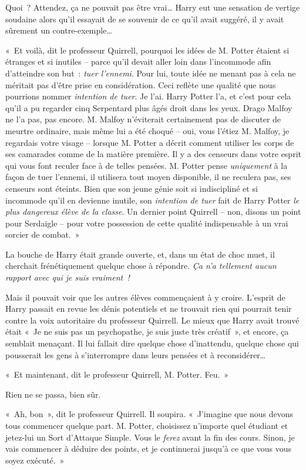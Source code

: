 Quoi~? Attendez, ça ne pouvait pas être vrai… Harry eut une sensation de vertige soudaine alors qu'il essayait de se souvenir de ce qu'il avait suggéré, il y avait sûrement un contre-exemple…

«~Et voilà, dit le professeur Quirrell, pourquoi les idées de M. Potter étaient si étranges et si inutiles -- parce qu'il devait aller loin dans l'incommode afin d'atteindre son but~: \emph{tuer l'ennemi}. Pour lui, toute idée ne menant pas à cela ne méritait pas d'être prise en considération. Ceci reflète une qualité que nous pourrions nommer \emph{intention de tuer}. Je l'ai. Harry Potter l'a, et c'est pour cela qu'il a pu regarder cinq Serpentard plus âgés droit dans les yeux. Drago Malfoy ne l'a pas, pas encore. M. Malfoy n'éviterait certainement pas de discuter de meurtre ordinaire, mais même lui a été choqué -- oui, vous l'étiez M. Malfoy, je regardais votre visage -- lorsque M. Potter a décrit comment utiliser les corps de ses camarades comme de la matière première. Il y a des censeurs dans votre esprit qui vous font reculer face à de telles pensées. M. Potter pense \emph{uniquement} à la façon de tuer l'ennemi, il utilisera tout moyen disponible, il ne reculera pas, ses censeurs sont éteints. Bien que son jeune génie soit si indiscipliné et si incommode qu'il en devienne inutile, son \emph{intention de tuer} fait de Harry Potter \emph{le plus dangereux élève de la classe}. Un dernier point Quirrell -- non, disons un point pour Serdaigle -- pour votre possession de cette qualité indispensable à un vrai sorcier de combat.~»

La bouche de Harry était grande ouverte, et, dans un état de choc muet, il cherchait frénétiquement quelque chose à répondre. \emph{Ça n'a tellement aucun rapport avec qui je suis vraiment~!}

Mais il pouvait voir que les autres élèves commençaient à y croire. L'esprit de Harry passait en revue les dénis potentiels et ne trouvait rien qui pourrait tenir contre la voix autoritaire du professeur Quirrell. Le mieux que Harry avait trouvé était «~Je ne suis pas un psychopathe, je suis juste très créatif~», et encore, ça semblait menaçant. Il lui fallait dire quelque chose d'inattendu, quelque chose qui pousserait les gens à s'interrompre dans leurs pensées et à reconsidérer…

«~Et maintenant, dit le professeur Quirrell, M. Potter. Feu.~»

Rien ne se passa, bien sûr.

«~Ah, bon~», dit le professeur Quirrell. Il soupira. «~J'imagine que nous devons tous commencer quelque part. M. Potter, choisissez n'importe quel étudiant et jetez-lui un Sort d'Attaque Simple. Vous le \emph{ferez} avant la fin des cours. Sinon, je vais commencer à déduire des points, et je continuerai jusqu'à ce que vous vous soyez exécuté.~»

